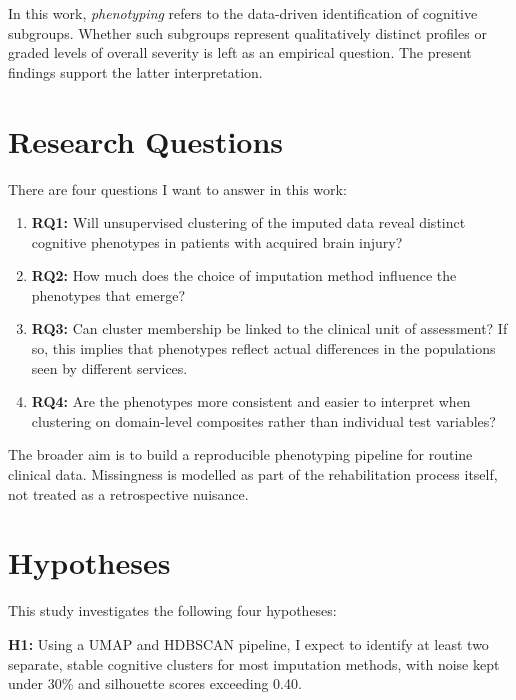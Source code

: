 In this work, \emph{phenotyping} refers to the data-driven identification of cognitive subgroups. Whether such subgroups represent qualitatively distinct profiles or graded levels of overall severity is left as an empirical question. The present findings support the latter interpretation.


\section{Research Questions}

There are four questions I want to answer in this work:

\begin{enumerate}
    \item \textbf{RQ1:} Will unsupervised clustering of the imputed data reveal distinct cognitive phenotypes in patients with acquired brain injury?
    \item \textbf{RQ2:} How much does the choice of imputation method influence the phenotypes that emerge?
    \item \textbf{RQ3:} Can cluster membership be linked to the clinical unit of assessment? If so, this implies that phenotypes reflect actual differences in the populations seen by different services.
    \item \textbf{RQ4:} Are the phenotypes more consistent and easier to interpret when clustering on domain-level composites rather than individual test variables?
\end{enumerate}

The broader aim is to build a reproducible phenotyping pipeline for routine clinical data. Missingness is modelled as part of the rehabilitation process itself, not treated as a retrospective nuisance.


\section{Hypotheses}

This study investigates the following four hypotheses:

\textbf{H1:} Using a UMAP and HDBSCAN pipeline, I expect to identify at least two separate, stable cognitive clusters for most imputation methods, with noise kept under 30\% and silhouette scores exceeding 0.40.

